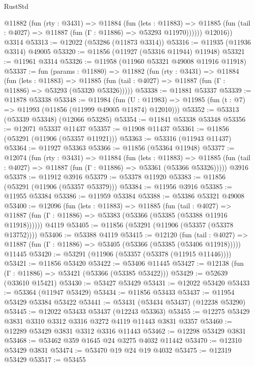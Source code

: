 \begin{lexlean}{RustStd}
\begin{coremodule}
          @11882
            (fun (rty : @3431) =>
            @11884
              (fun (lets : @11883) =>
              @11885 (fun (tail : @4027) => @11887 (fun (Γ : @11886) => @53293 @11970))))))
        @12016))
    @3314
@53313 := @12022 (@53286 (@11873 @3314))
@53316 := @11935 (@11936 @3314) @49005
@53320 := @11856 (@11927 (@53316 @11944) @11948)
@53321 := @11961 @3314
@53326 := @11958 (@11960 @53321 @49008 @11916 @11918)
@53337 := fun (params : @11880) =>
  @11882
    (fun (rty : @3431) =>
    @11884
      (fun (lets : @11883) =>
      @11885 (fun (tail : @4027) => @11887 (fun (Γ : @11886) => @53293 (@53320 @53326)))))
@53338 := @11881 @53337
@53339 := @11878 @53338
@53348 := @11984
    (fun (U : @11983) => @11985 (fun (t : @7) => @11993 (@11856 (@11999 @49005 @11874) @12010)))
@53352 := @53313 (@53339 @53348) (@12066 @53285)
@53354 := @11841 @53338 @53348
@53356 := @12071 @53337 @11437
@53357 := @11908 @11437
@53361 := @11856 (@53291 (@11906 (@53357 @11921)))
@53363 := @53316 (@11943 @11437)
@53364 := @11927 @53363
@53366 := @11856 (@53364 @11948)
@53377 := @12074
    (fun (rty : @3431) =>
    @11884
      (fun (lets : @11883) =>
      @11885 (fun (tail : @4027) => @11887 (fun (Γ : @11886) => @53361 (@53366 @53326)))))
    @3916
@53378 := @11912 @3916
@53379 := @53378 @11920
@53383 := @11856 (@53291 (@11906 (@53357 @53379)))
@53384 := @11956 @3916
@53385 := @11955 @53384
@53386 := @11959 @53384
@53388 := @53386 @53321 @49008
@53400 := @12096
    (fun (lets : @11883) =>
    @11885
      (fun (tail : @4027) =>
      @11887 (fun (Γ : @11886) => @53383 (@53366 (@53385 (@53388 @11916 @11918))))))
    @4119
@53405 := @11856 (@53291 (@11906 (@53357 (@53378 @13752))))
@53406 := @53388 @4119
@53415 := @12120
    (fun (tail : @4027) => @11887 (fun (Γ : @11886) => @53405 (@53366 (@53385 (@53406 @11918)))))
    @11445
@53420 := @53291 (@11906 (@53357 (@53378 (@11915 @11446))))
@53421 := @11856 @53420
@53422 := @53406 @11445
@53427 := @12138 (fun (Γ : @11886) => @53421 (@53366 (@53385 @53422)))
@53429 := @52639 (@33610 @15421)
@53430 := @53427 @53429
@53431 := @12022 @53420
@53433 := @53364 (@11947 @53429)
@53434 := @11856 @53433
@53437 := @11954 @53429 @53384 @53422
@53441 := @53431 (@53434 @53437) (@12238 @53290)
@53445 := @12022 @53433 @53437 (@12243 @53363)
@53455 := @12275 @53429 @3831 @3310 @3312 @3316 @3272 @4119 @11443 @3831 @3357
@53460 := @12289 @53429 @3831 @3312 @3316 @11443
@53462 := @12298 @53429 @3831
@53468 := @53462 @359 @1645 @24 @3275 @4032 @11442
@53470 := @12310 @53429 @3831
@53474 := @53470 @19 @24 @19 @4032
@53475 := @12319 @53429
@53517 := @53455

\end{coremodule}
\end{lexlean}
